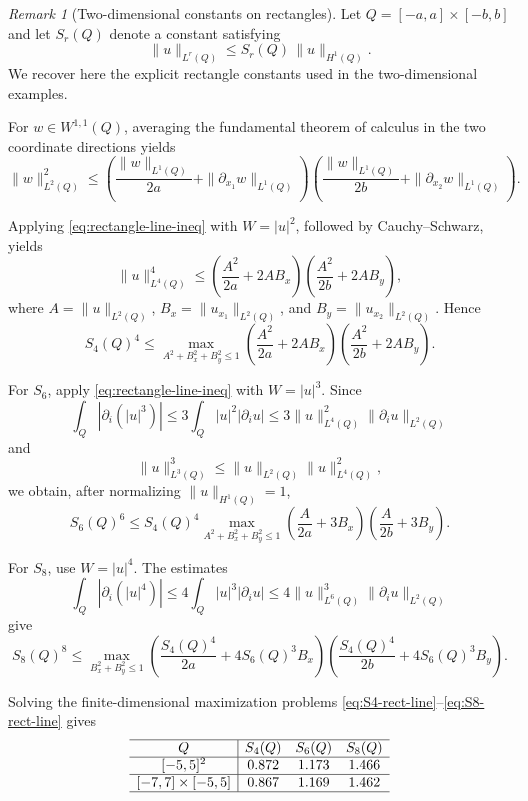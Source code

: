 \documentclass[11pt]{article}
\theoremstyle{plain}
\theoremstyle{definition}
\theoremstyle{remark}
\newtheorem{remark}{Remark}
\begin{document}
\medskip

\begin{remark}[Two-dimensional constants on rectangles]
\label{rmk:rect-L8}
Let $Q=[-a,a]\times[-b,b]$ and let $S_r(Q)$ denote a constant
satisfying
\[
  \|u\|_{L^r(Q)} \le S_r(Q)\,\|u\|_{H^1(Q)}.
\]
We recover here the explicit rectangle constants used in the two-dimensional
examples.

For $w\in W^{1,1}(Q)$, averaging the fundamental theorem of calculus in the
two coordinate directions yields
\begin{equation}
\label{eq:rectangle-line-ineq}
  \|w\|_{L^2(Q)}^2
  \le
  \left(\frac{\|w\|_{L^1(Q)}}{2a}+\|\partial_{x_1}w\|_{L^1(Q)}\right)
  \left(\frac{\|w\|_{L^1(Q)}}{2b}+\|\partial_{x_2}w\|_{L^1(Q)}\right).
\end{equation}

Applying \eqref{eq:rectangle-line-ineq} with $W=|u|^2$, followed by
Cauchy--Schwarz, yields
\[
  \|u\|_{L^4(Q)}^4
  \le
  \left(\frac{A^2}{2a}+2AB_x\right)
  \left(\frac{A^2}{2b}+2AB_y\right),
\]
where $A=\|u\|_{L^2(Q)}$, $B_x=\|u_{x_1}\|_{L^2(Q)}$, and
$B_y=\|u_{x_2}\|_{L^2(Q)}$. Hence
\begin{equation}
\label{eq:S4-rect-line}
  S_4(Q)^4
  \le
  \max_{A^2+B_x^2+B_y^2\le1}
  \left(\frac{A^2}{2a}+2AB_x\right)
  \left(\frac{A^2}{2b}+2AB_y\right).
\end{equation}

For $S_6$, apply \eqref{eq:rectangle-line-ineq} with $W=|u|^3$. Since
\[
  \int_Q |\partial_i(|u|^3)|
  \le 3\int_Q |u|^2|\partial_i u|
  \le 3\|u\|_{L^4(Q)}^2\|\partial_i u\|_{L^2(Q)}
\]
and
\[
  \|u\|_{L^3(Q)}^3\le \|u\|_{L^2(Q)}\|u\|_{L^4(Q)}^2,
\]
we obtain, after normalizing $\|u\|_{H^1(Q)}=1$,
\begin{equation}
\label{eq:S6-rect-line}
  S_6(Q)^6
  \le
  S_4(Q)^4
  \max_{A^2+B_x^2+B_y^2\le1}
  \left(\frac{A}{2a}+3B_x\right)
  \left(\frac{A}{2b}+3B_y\right).
\end{equation}

For $S_8$, use $W=|u|^4$. The estimates
\[
  \int_Q |\partial_i(|u|^4)|
  \le 4\int_Q |u|^3|\partial_i u|
  \le 4\|u\|_{L^6(Q)}^3\|\partial_i u\|_{L^2(Q)}
\]
give
\begin{equation}
\label{eq:S8-rect-line}
  S_8(Q)^8
  \le
  \max_{B_x^2+B_y^2\le1}
  \left(\frac{S_4(Q)^4}{2a}+4S_6(Q)^3B_x\right)
  \left(\frac{S_4(Q)^4}{2b}+4S_6(Q)^3B_y\right).
\end{equation}

Solving the finite-dimensional maximization problems
\eqref{eq:S4-rect-line}--\eqref{eq:S8-rect-line} gives
\[
\begin{array}{c|ccc}
\hline
Q & S_4(Q) & S_6(Q) & S_8(Q)\\ \hline
[-5,5]^2 & 0.872 & 1.173 & 1.466\\
\hline
[-7,7]\times[-5,5] & 0.867 & 1.169 & 1.462 \\
\hline
\end{array}
\]
\end{remark}
\end{document}

